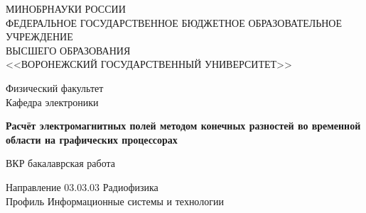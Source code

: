 \begin{titlepage}

\centering
\begingroup
\fontsize{10pt}{10pt}\selectfont
МИНОБРНАУКИ РОССИИ\\
ФЕДЕРАЛЬНОЕ ГОСУДАРСТВЕННОЕ БЮДЖЕТНОЕ ОБРАЗОВАТЕЛЬНОЕ УЧРЕЖДЕНИЕ\\
ВЫСШЕГО ОБРАЗОВАНИЯ\\
<<ВОРОНЕЖСКИЙ ГОСУДАРСТВЕННЫЙ УНИВЕРСИТЕТ>>\\
\endgroup
\vspace{20mm}

Физический факультет\\
Кафедра электроники

\vspace{25mm}

\textbf{
    Расчёт электромагнитных полей методом конечных разностей во временной области на графических процессорах}

\vspace{15mm}

ВКР бакалаврская работа\\

\vspace{10mm}

Направление 03.03.03 Радиофизика\\
Профиль Информационные системы и технологии\\

\vspace{20mm}



\end{titlepage}
